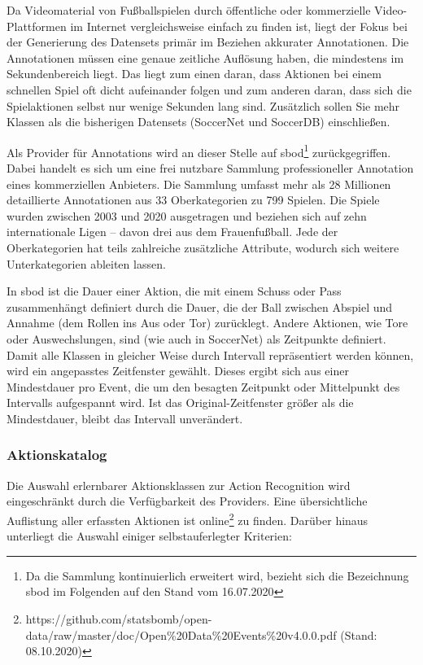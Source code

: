 Da Videomaterial von Fußballspielen durch öffentliche oder kommerzielle Video-Plattformen im Internet vergleichsweise einfach zu finden ist, liegt der Fokus bei der Generierung des Datensets primär im Beziehen akkurater Annotationen.
Die Annotationen müssen eine genaue zeitliche Auflösung haben, die mindestens im Sekundenbereich liegt.
Das liegt zum einen daran, dass Aktionen bei einem schnellen Spiel oft dicht aufeinander folgen und zum anderen daran, dass sich die Spielaktionen selbst nur wenige Sekunden lang sind.
Zusätzlich sollen Sie mehr Klassen als die bisherigen Datensets (SoccerNet und SoccerDB) einschließen.

Als Provider für Annotations wird an dieser Stelle auf \gls{sbod}\footnote{Da die Sammlung kontinuierlich erweitert wird, bezieht sich die Bezeichnung \gls{sbod} im Folgenden auf den Stand vom 16.07.2020} \cite{Statsbomb20} zurückgegriffen.
Dabei handelt es sich um eine frei nutzbare Sammlung professioneller Annotation eines kommerziellen Anbieters.
Die Sammlung umfasst mehr als 28 Millionen detaillierte Annotationen aus 33 Oberkategorien zu 799 Spielen.
Die Spiele wurden zwischen 2003 und 2020 ausgetragen und beziehen sich auf zehn internationale Ligen -- davon drei aus dem Frauenfußball.
Jede der Oberkategorien hat teils zahlreiche zusätzliche Attribute, wodurch sich weitere Unterkategorien ableiten lassen.

In \gls{sbod} ist die Dauer einer Aktion, die mit einem Schuss oder Pass zusammenhängt definiert durch die Dauer, die der Ball zwischen Abspiel und Annahme (\bzw dem Rollen ins Aus oder Tor) zurücklegt.
Andere Aktionen, wie Tore oder Auswechslungen, sind (wie auch in SoccerNet) als Zeitpunkte definiert.
Damit alle Klassen in gleicher Weise durch Intervall repräsentiert werden können, wird ein angepasstes Zeitfenster gewählt.
Dieses ergibt sich aus einer Mindestdauer pro Event, die um den besagten Zeitpunkt oder Mittelpunkt des Intervalls aufgespannt wird.
Ist das Original-Zeitfenster größer als die Mindestdauer, bleibt das Intervall unverändert.

\subsubsection*{Aktionskatalog}

Die Auswahl erlernbarer Aktionsklassen zur Action Recognition wird eingeschränkt durch die Verfügbarkeit des Providers.
Eine übersichtliche Auflistung aller erfassten Aktionen ist online\footnote{https://github.com/statsbomb/open-data/raw/master/doc/Open\%20Data\%20Events\%20v4.0.0.pdf (Stand: 08.10.2020)} zu finden.
Darüber hinaus unterliegt die Auswahl einiger selbstauferlegter Kriterien:

